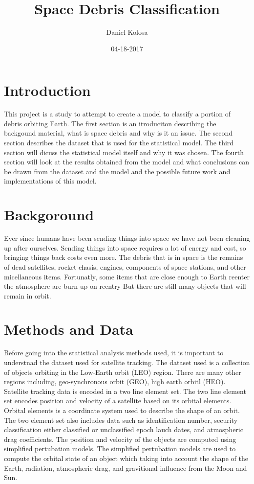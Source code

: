 \documentclass[12pt,a4paper]{article}
\title{Space Debris Classification}
\author{Daniel Kolosa}
\date{04-18-2017}
\begin{document}
\maketitle

\section{Introduction}
This project is a study to attempt to create a model to classify a portion of debris orbiting Earth. The first section is an itroduciton describing the backgound material, what is space debris and why is it an issue. The second section describes the dataset that is used for the statistical model. The third section will dicuss the statistical model itself and why it was chosen. The fourth section will look at the results obtained from the model and what conclusions can be drawn from the dataset and the model and the possible future work and implementations of this model.   

\section{Backgoround}
Ever since humans have been sending things into space we have not been cleaning up after ourselves. Sending things into space requires a lot of energy and cost, so bringing things back costs even more. The debris that is in space is the remains of dead satellites, rocket chasis, engines, components of space stations, and other micellaneous items. Fortunatly, some items that are close enough to Earth reenter the atmosphere are burn up on reentry But there are still many objects that will remain in orbit. 

\section{Methods and Data}
Before going into the statistical analysis methods used, it is important to understnad the dataset used for satellite tracking.
The dataset used is a collection of objects orbiting in the Low-Earth orbit (LEO) region. There are many other regions including, geo-synchronous orbit (GEO), high earth orbitl (HEO). Satellite tracking data is encoded in a two line element set. The two line element set encodes position and velocity of a satellite based on its orbital elements. Orbital elements is a coordinate system used to describe the shape of an orbit. The two element set also includes data such as identification number, security classification either classified or unclassified epoch lauch dates, and atmospheric drag coefficients. The position and velocity of the objects are computed using simplified pertubation models. The simplified pertubation models are used to compute the orbital state of an object which taking into account the shape of the Earth, radiation, atmospheric drag, and gravitional influence from the Moon and Sun.
\end{document}
